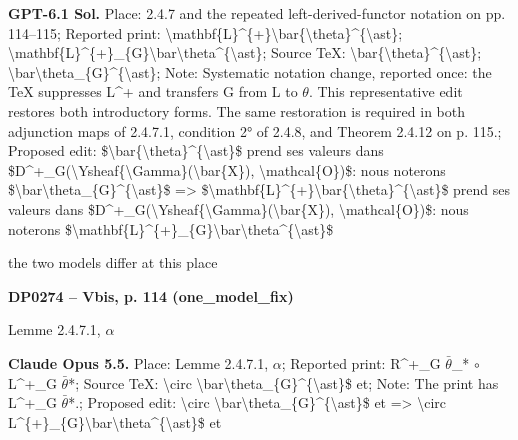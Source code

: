 \textbf{GPT-6.1 Sol.} Place: 2.4.7 and the repeated left-derived-functor notation on pp. 114–115; Reported print: \textbackslash{}mathbf\{L\}\textasciicircum{}\{+\}\textbackslash{}bar\{\textbackslash{}theta\}\textasciicircum{}\{\textbackslash{}ast\}; \textbackslash{}mathbf\{L\}\textasciicircum{}\{+\}\_\{G\}\textbackslash{}bar\textbackslash{}theta\textasciicircum{}\{\textbackslash{}ast\}; Source TeX: \textbackslash{}bar\{\textbackslash{}theta\}\textasciicircum{}\{\textbackslash{}ast\}; \textbackslash{}bar\textbackslash{}theta\_\{G\}\textasciicircum{}\{\textbackslash{}ast\}; Note: Systematic notation change, reported once: the TeX suppresses L\textasciicircum{}+ and transfers G from L to \ensuremath{\theta}. This representative edit restores both introductory forms. The same restoration is required in both adjunction maps of 2.4.7.1, condition 2° of 2.4.8, and Theorem 2.4.12 on p. 115.; Proposed edit: \$\textbackslash{}bar\{\textbackslash{}theta\}\textasciicircum{}\{\textbackslash{}ast\}\$ prend ses valeurs dans \$D\textasciicircum{}+\_G(\textbackslash{}Ysheaf\{\textbackslash{}Gamma\}(\textbackslash{}bar\{X\}), \textbackslash{}mathcal\{O\})\$: nous noterons \$\textbackslash{}bar\textbackslash{}theta\_\{G\}\textasciicircum{}\{\textbackslash{}ast\}\$ =\allowbreak > \$\textbackslash{}mathbf\{L\}\textasciicircum{}\{+\}\textbackslash{}bar\{\textbackslash{}theta\}\textasciicircum{}\{\textbackslash{}ast\}\$ prend ses valeurs dans \$D\textasciicircum{}+\_G(\textbackslash{}Ysheaf\{\textbackslash{}Gamma\}(\textbackslash{}bar\{X\}), \textbackslash{}mathcal\{O\})\$: nous noterons \$\textbackslash{}mathbf\{L\}\textasciicircum{}\{+\}\_\{G\}\textbackslash{}bar\textbackslash{}theta\textasciicircum{}\{\textbackslash{}ast\}\$\par
the two models differ at this place\par
\par\noindent\hypertarget{DP0274}{}\textbf{DP0274 -- Vbis, p. 114 (one\_model\_fix)}\par
Lemme 2.4.7.1, \ensuremath{\alpha}\par
\textbf{Claude Opus 5.5.} Place: Lemme 2.4.7.1, \ensuremath{\alpha}; Reported print: R\textasciicircum{}+\_G \ensuremath{\bar{\theta}}\_* \ensuremath{\circ} L\textasciicircum{}+\_G \ensuremath{\bar{\theta}}*; Source TeX: \textbackslash{}circ \textbackslash{}bar\textbackslash{}theta\_\{G\}\textasciicircum{}\{\textbackslash{}ast\}\$ et; Note: The print has L\textasciicircum{}+\_G \ensuremath{\bar{\theta}}*.; Proposed edit: \textbackslash{}circ \textbackslash{}bar\textbackslash{}theta\_\{G\}\textasciicircum{}\{\textbackslash{}ast\}\$ et =\allowbreak > \textbackslash{}circ L\textasciicircum{}\{+\}\_\{G\}\textbackslash{}bar\textbackslash{}theta\textasciicircum{}\{\textbackslash{}ast\}\$ et\par
